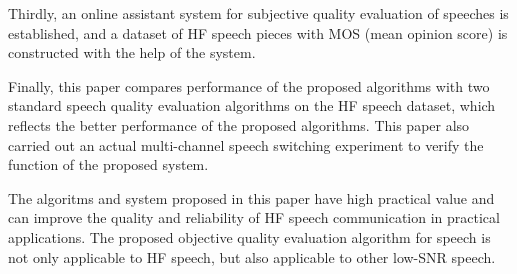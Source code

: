\begin{eabstract}
Thirdly, an online assistant system for subjective quality evaluation of speeches is established, and a dataset of HF speech pieces with MOS (mean opinion score) is constructed with the help of the system.

Finally, this paper compares performance of the proposed algorithms with two standard speech quality evaluation algorithms on the HF speech dataset, which reflects the better performance of the proposed algorithms. This paper also carried out an actual multi-channel speech switching experiment to verify the function of the proposed system.

The algoritms and system proposed in this paper have high practical value and can improve the quality and reliability of HF speech communication in practical applications. The proposed objective quality evaluation algorithm for speech is not only applicable to HF speech, but also applicable to other low-SNR speech.

\end{eabstract}

